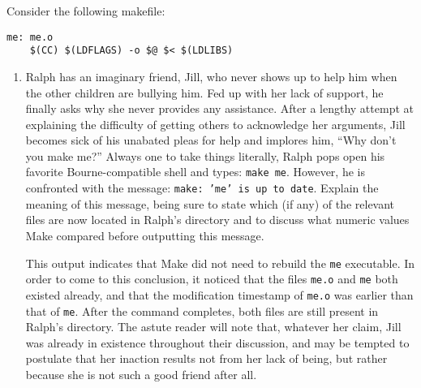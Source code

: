 Consider the following makefile:
\begin{lstlisting}
me: me.o
	$(CC) $(LDFLAGS) -o $@ $< $(LDLIBS)
\end{lstlisting}

\begin{enumerate}
\item
Ralph has an imaginary friend, Jill, who never shows up to help him when the other children are bullying him.
Fed up with her lack of support, he finally asks why she never provides any assistance.
After a lengthy attempt at explaining the difficulty of getting others to acknowledge her arguments, Jill becomes sick of his unabated pleas for help and implores him, ``Why don't you make me?''
Always one to take things literally, Ralph pops open his favorite Bourne-compatible shell and types: \texttt{make me}.
However, he is confronted with the message: \texttt{make:\ 'me' is up to date}.
Explain the meaning of this message, being sure to state which (if any) of the relevant files are now located in Ralph's directory and to discuss what numeric values Make compared before outputting this message.

\begin{answer}
This output indicates that Make did not need to rebuild the \texttt{me} executable.
In order to come to this conclusion, it noticed that the files \texttt{me.o} and \texttt{me} both existed already, and that the modification timestamp of \texttt{me.o} was earlier than that of \texttt{me}.
After the command completes, both files are still present in Ralph's directory.
The astute reader will note that, whatever her claim, Jill was already in existence throughout their discussion, and may be tempted to postulate that her inaction results not from her lack of being, but rather because she is not such a good friend after all.
\end{answer}
\end{enumerate}
